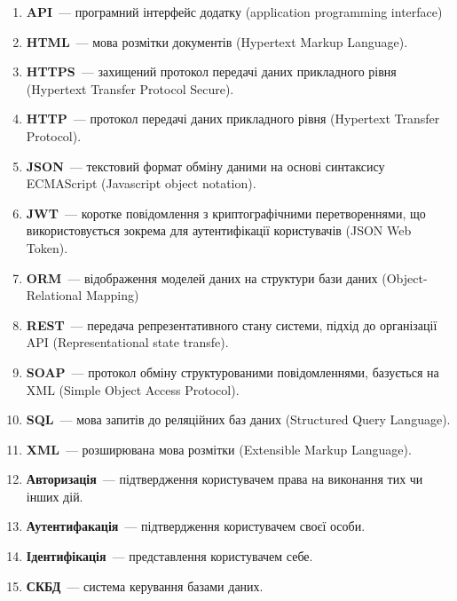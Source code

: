 
\begin{enumerate}[label={\arabic*.}, leftmargin=0cm]
\item \textbf{API}~--- програмний інтерфейс додатку (application programming interface)
\item \textbf{HTML}~--- мова розмітки документів (Hypertext Markup Language).
\item \textbf{HTTPS}~--- захищений протокол передачі даних прикладного рівня (Hypertext Transfer Protocol Secure).
\item \textbf{HTTP}~--- протокол передачі даних прикладного рівня (Hypertext Transfer Protocol).
\item \textbf{JSON}~--- текстовий формат обміну даними на основі синтаксису ECMAScript (Javascript object notation).
\item \textbf{JWT}~--- коротке повідомлення з криптографічними перетвореннями, що використовується зокрема для аутентифікації користувачів (JSON Web Token).
\item \textbf{ORM}~--- відображення моделей даних на структури бази даних (Object-Relational Mapping)
\item \textbf{REST}~--- передача репрезентативного стану системи, підхід до організації API (Representational state transfe).
\item \textbf{SOAP}~--- протокол обміну структурованими повідомленнями, базується на XML (Simple Object Access Protocol).
\item \textbf{SQL}~--- мова запитів до реляційних баз даних (Structured Query Language).
\item \textbf{XML}~--- розширювана мова розмітки (Extensible Markup Language).
\item \textbf{Авторизація}~--- підтвердження користувачем права на виконання тих чи інших дій.
\item \textbf{Аутентифакація}~--- підтвердження користувачем своєї особи.
\item \textbf{Ідентифікація}~--- представлення користувачем себе.
\item \textbf{СКБД}~--- система керування базами даних.


\end{enumerate}